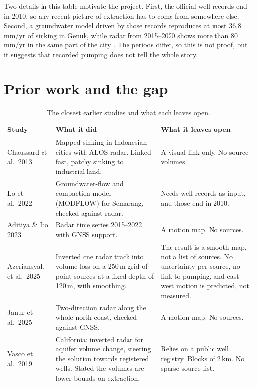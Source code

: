 Two details in this table motivate the project. First, the official well records end in 2010, so any
recent picture of extraction has to come from somewhere else. Second, a groundwater model driven by
those records reproduces at most 36.8\,mm/yr of sinking in Genuk, while radar from 2015--2020 shows
more than 80\,mm/yr in the same part of the city \cite{lo2022}. The periods differ, so this is not
proof, but it suggests that recorded pumping does not tell the whole story.

\section{Prior work and the gap}\label{sec:prior}

{\small
\begin{xltabular}{\linewidth}{@{}L{31mm}Y Y@{}}
\caption{The closest earlier studies and what each leaves open.}\label{tab:prior}\\*
\toprule
\textbf{Study} & \textbf{What it did} & \textbf{What it leaves open}\\*
\midrule
Chaussard et al.\ 2013 \cite{chaussard2013} & Mapped sinking in Indonesian cities with ALOS radar. Linked
  fast, patchy sinking to industrial land. & A visual link only. No source volumes.\\
Lo et al.\ 2022 \cite{lo2022} & Groundwater-flow and compaction model (MODFLOW) for Semarang, checked against
  radar. & Needs well records as input, and those end in 2010.\\
Aditiya \& Ito 2023 \cite{aditiya2023} & Radar time series 2015--2022 with GNSS support. & A motion map. No
  sources.\\
Azeriansyah et al.\ 2025 \cite{azeriansyah2025} & Inverted one radar track into volume loss on a 250\,m grid of
  point sources at a fixed depth of 120\,m, with smoothing. & The result is a smooth map, not a list of sources.
  No uncertainty per source, no link to pumping, and east--west motion is predicted, not measured.\\
Janur et al.\ 2025 \cite{janur2025} & Two-direction radar along the whole north coast, checked against GNSS. &
  A motion map. No sources.\\
Vasco et al.\ 2019 \cite{vasco2019} & California: inverted radar for aquifer volume change, steering the
  solution towards registered wells. Stated the volumes are lower bounds on extraction. & Relies on a public
  well registry. Blocks of 2\,km. No sparse source list.\\
\bottomrule
\end{xltabular}}


